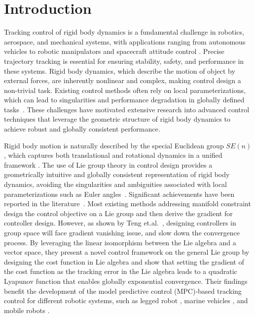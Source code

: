\documentclass[lettersize,journal]{IEEEtran}
\begin{document}
\section{Introduction}
Tracking control of rigid body dynamics is a fundamental challenge in robotics, aerospace, and mechanical systems, with applications ranging from autonomous vehicles to robotic manipulators and spacecraft attitude control \cite{li2024prescribed, 10508075,10560008}. Precise trajectory tracking is essential for ensuring stability, safety, and performance in these systems. Rigid body dynamics, which describe the motion of object by external forces, are inherently nonlinear and complex, making control design a non-trivial task. Existing control methods often rely on local parameterizations, which can lead to singularities and performance degradation in globally defined tasks~\cite{pmlr-v155-song21a, ALTRO,9069467}. These challenges have motivated extensive research into advanced control techniques that leverage the geometric structure of rigid body dynamics to achieve robust and globally consistent performance. %


Rigid body motion is naturally described by the special Euclidean group $SE(n)$, which captures both translational and rotational dynamics in a unified framework \cite{murray2017mathematical}. The use of Lie group theory in control design provides a geometrically intuitive and globally consistent representation of rigid body dynamics, avoiding the singularities and ambiguities associated with local parameterizations such as Euler angles~\cite{micro-lie-theory}. Significant achievements have been reported in the literature~\cite{representation-free,RODRIGUEZCORTES2022105360}. Most existing methods addressing manifold constraint design the control objective on a Lie group and then derive the gradient for controller design. However, as shown by Teng et.al.~\cite{lie-algebra}, designing controllers in group space will face gradient vanishing issue, and slow down the convergence process. By leveraging the linear isomorphism between the Lie algebra and a vector space, they present a novel control framework on the general Lie group by designing the cost function in Lie algebra and show that setting the gradient of the cost function as the tracking error in the Lie algebra leads to a quadratic Lyapunov function that enables globally exponential convergence. Their findings benefit the development of the model predictive control (MPC)-based tracking control for different robotic systems, such as legged robot \cite{9981282}, marine vehicles \cite{teng-marien-vehicle}, and mobile robots \cite{GMPC}.
\end{document}
